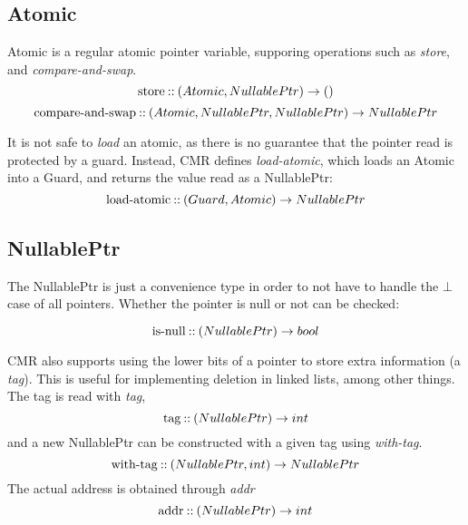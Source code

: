 \subsection{Atomic}

Atomic is a regular atomic pointer variable, supporing operations such as \emph{store}, and
\emph{compare-and-swap}.
\begin{equation}\label{eq:atomic-store}
  \text{store\:::\:} (Atomic, NullablePtr) \to ()
\end{equation}
\begin{equation}\label{eq:atomic-cas}
  \text{compare-and-swap\:::\:} (Atomic, NullablePtr, NullablePtr) \to NullablePtr
\end{equation}

It is not safe to \emph{load} an atomic, as there is no guarantee that the
pointer read is protected by a guard. Instead, CMR defines \emph{load-atomic}, which loads an
Atomic into a Guard, and returns the value read as a NullablePtr:
\begin{equation}\label{eq:load-atomic}
  \text{load-atomic\:::\:} (Guard, Atomic) \to NullablePtr
\end{equation}

\subsection{NullablePtr}

The NullablePtr is just a convenience type in order to not have to handle the $\bot$ case of all
pointers. Whether the pointer is null or not can be checked:

\begin{equation}\label{eq:nullable-is-null}
  \text{is-null\:::\:} (NullablePtr) \to bool
\end{equation}

CMR also supports using the lower bits of a pointer to store extra information (a \emph{tag}). This
is useful for implementing deletion in linked lists, among other things.  The tag is read with
\emph{tag},
\begin{equation}\label{eq:ptr-tag}
  \text{tag\:::\:} (NullablePtr) \to int
\end{equation}
and a new NullablePtr can be constructed with a given tag using \emph{with-tag}.
\begin{equation}\label{eq:ptr-with-tag}
  \text{with-tag\:::\:} (NullablePtr, int) \to NullablePtr
\end{equation}
The actual address is obtained through \emph{addr}
\begin{equation}\label{eq:ptr-addr}
  \text{addr\:::\:} (NullablePtr) \to int
\end{equation}


